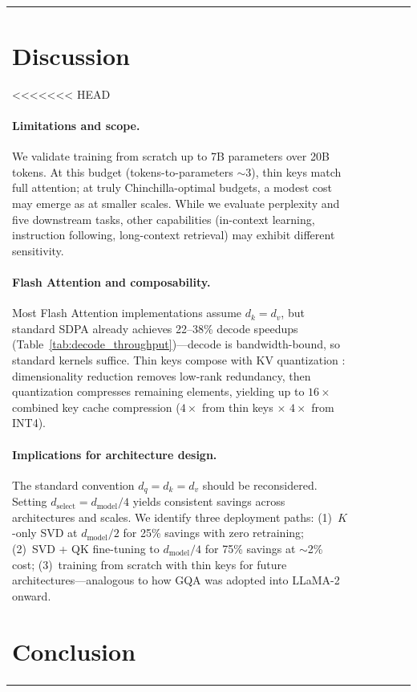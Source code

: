 \documentclass[11pt]{article}
\newcommand{\dmodel}{d_{\text{model}}}
\newcommand{\dselect}{d_{\text{select}}}
\begin{document}
\begin{table}[h]
\begin{tabular}{lccccc}
\section{Discussion}

<<<<<<< HEAD
\paragraph{Limitations and scope.}
We validate training from scratch up to 7B parameters over 20B tokens. At this budget (tokens-to-parameters $\sim$3), thin keys match full attention; at truly Chinchilla-optimal budgets, a modest cost may emerge as at smaller scales. While we evaluate perplexity and five downstream tasks, other capabilities (in-context learning, instruction following, long-context retrieval) may exhibit different sensitivity.

\paragraph{Flash Attention and composability.}
Most Flash Attention implementations assume $d_k = d_v$, but standard SDPA already achieves 22--38\% decode speedups (Table~\ref{tab:decode_throughput})---decode is bandwidth-bound, so standard kernels suffice. Thin keys compose with KV quantization \citep{liu2024kivi, kvquant2024, asymkv2024}: dimensionality reduction removes low-rank redundancy, then quantization compresses remaining elements, yielding up to $16\times$ combined key cache compression ($4\times$ from thin keys $\times$ $4\times$ from INT4).

\paragraph{Implications for architecture design.}
The standard convention $d_q = d_k = d_v$ should be reconsidered. Setting $\dselect = \dmodel / 4$ yields consistent savings across architectures and scales. We identify three deployment paths: (1)~$K$-only SVD at $\dmodel/2$ for 25\% savings with zero retraining; (2)~SVD + QK fine-tuning to $\dmodel/4$ for 75\% savings at $\sim$2\% cost; (3)~training from scratch with thin keys for future architectures---analogous to how GQA was adopted into LLaMA-2 onward.


\section{Conclusion}


\end{tabular}
\end{table}
\end{document}
